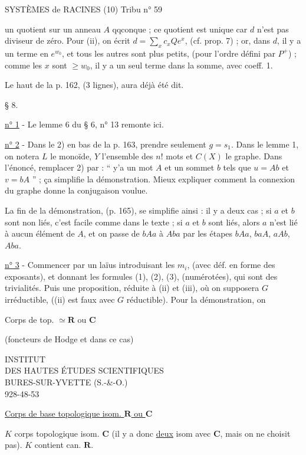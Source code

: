 
SYSTÈMES de RACINES (10) \hfill Tribu n° 59

un quotient sur un anneau $A$ qqconque ; ce quotient est unique car $d$ n'est pas diviseur de zéro. Pour (ii), on écrit $d=\sum_x c_x Qe^x$, (cf. prop. 7) ; or, dans $d$, il y a un terme en $e^{w_0}$, et tous les autres sont plus petits, (pour l'ordre défini par $P^+$) ; comme les $x$ sont $\geq w_0$, il y a un seul terme dans la somme, avec coeff. 1.

Le haut de la p. 162, (3 lignes), aura déjà été dit.

§ 8. 

\uline{n° 1} - Le lemme 6 du § 6, n° 13 remonte ici.

\uline{n° 2} - Dans le 2) en bas de la p. 163, prendre seulement $g=s_1$. Dans le lemme 1, on notera $L$ le monoïde, $Y$ l'ensemble des $n!$ mots et $C(X)$ le graphe. Dans l'énoncé, remplacer 2) par : `` y'a un mot $A$ et un sommet $b$ tels que $u=Ab$ et $v=bA$ '' ; ça simplifie la démonstration. Mieux expliquer comment la connexion du graphe donne la conjugaison voulue.

La fin de la démonstration, (p. 165), se simplifie ainsi : il y a deux cas ; si $a$ et $b$ sont non liés, c'est facile comme dans le texte ; si $a$ et $b$ sont liés, alors $a$ n'est lié à aucun élément de $A$, et on passe de $bAa$ à $Aba$ par les étapes $bAa$, $baA$, $aAb$, $Aba$.

\uline{n° 3} - Commencer par un laïus introduisant les $m_i$, (avec déf. en forme des exposants), et donnant les formules (1), (2), (3), (numérotées), qui sont des trivialités. Puis une proposition, réduite à (ii) et (iii), où on supposera $G$ irréductible, ((ii) est faux avec $G$ réductible). Pour la démonstration, on

Corps de  top. $\simeq\mathbf R$ ou $\mathbf C$

(foncteurs de Hodge et  dans ce cas)


INSTITUT\\
DES HAUTES ÉTUDES SCIENTIFIQUES\\
BURES-SUR-YVETTE (S.-\&-O.)\\
928-48-53

\uline{Corps de base topologique isom.  $\mathbf R$ ou $\mathbf C$}

$K$ corps topologique isom.  $\mathbf C$ (il y a donc \uline{deux} isom avec $\mathbf C$, mais on ne choisit pas). $K$ contient can. $\mathbf R$.

